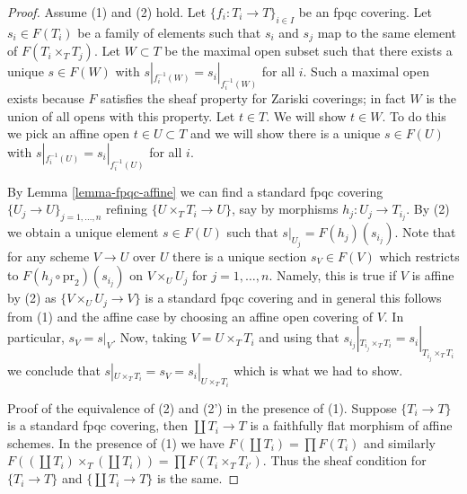 \documentclass[10pt,a4paper]{amsart}
\theoremstyle{plain}
\theoremstyle{definition}
\theoremstyle{remark}
\numberwithin{equation}{subsection}
\begin{document}
\begin{proof}
Assume (1) and (2) hold.
Let $\{f_i : T_i \to T\}_{i \in I}$ be an fpqc covering. Let $s_i \in F(T_i)$
be a family of elements such that $s_i$ and $s_j$ map to the same element
of $F(T_i \times_T T_j)$. Let $W \subset T$ be the maximal open subset
such that there exists a unique $s \in F(W)$ with
$s|_{f_i^{-1}(W)} = s_i|_{f_i^{-1}(W)}$ for all $i$.
Such a maximal open exists because $F$ satisfies the
sheaf property for Zariski coverings; in fact $W$ is the
union of all opens with this property. Let $t \in T$.
We will show $t \in W$. To do this we pick an affine open
$t \in U \subset T$ and we will show there is a unique
$s \in F(U)$ with
$s|_{f_i^{-1}(U)} = s_i|_{f_i^{-1}(U)}$ for all $i$.

\medskip\noindent
By Lemma \ref{lemma-fpqc-affine} we can find a standard fpqc covering
$\{U_j \to U\}_{j = 1, \ldots, n}$ refining $\{U \times_T T_i \to U\}$,
say by morphisms $h_j : U_j \to T_{i_j}$. By (2) we obtain a unique element
$s \in F(U)$ such that $s|_{U_j} = F(h_j)(s_{i_j})$. Note that for any
scheme $V \to U$ over $U$ there is a unique section $s_V \in F(V)$
which restricts to $F(h_j \circ \text{pr}_2)(s_{i_j})$ on
$V \times_U U_j$ for $j = 1, \ldots, n$. Namely, this is true if $V$
is affine by (2) as $\{V \times_U U_j \to V\}$ is a standard fpqc covering
and in general this follows from (1) and the affine case by choosing an
affine open covering of $V$. In particular, $s_V = s|_V$.
Now, taking $V = U \times_T T_i$ and using that
$s_{i_j}|_{T_{i_j} \times_T T_i} = s_i|_{T_{i_j} \times_T T_i}$
we conclude that $s|_{U \times_T T_i} = s_V = s_i|_{U \times_T T_i}$
which is what we had to show.

\medskip\noindent
Proof of the equivalence of (2) and (2') in the presence of (1).
Suppose $\{T_i \to T\}$ is a standard fpqc covering, then
$\coprod T_i \to T$ is a faithfully flat morphism of affine schemes.
In the presence of (1) we have $F(\coprod T_i) = \prod F(T_i)$
and similarly
$F((\coprod T_i) \times_T (\coprod T_i)) = \prod F(T_i \times_T T_{i'})$.
Thus the sheaf condition for $\{T_i \to T\}$ and $\{\coprod T_i \to T\}$
is the same.
\end{proof}
\end{document}
